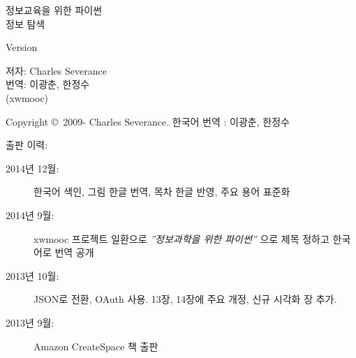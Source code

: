



\newtheorem{ex}{Exercise}[chapter]

\begin{latexonly}

\renewcommand{\blankpage}{\thispagestyle{empty} \quad \newpage}

\thispagestyle{empty}

\begin{flushright}
\vspace*{2.0in}

\begin{spacing}{3}
{\huge 정보교육을 위한 파이썬}\\
{\Large 정보 탐색}
\end{spacing}

\vspace{0.25in}

Version \theversion

\vspace{0.5in}


{\Large
저자: Charles Severance\\
번역: 이광춘, 한정수 \\
(xwmooc)
}

\vfill

\end{flushright}

\pagebreak
\thispagestyle{empty}

{\small
Copyright \copyright ~2009- Charles Severance.
한국어 번역 : 이광춘, 한정수

출판 이력:

\begin{description}

\item[2014년 12월:] 한국어 색인, 그림 한글 번역, 목차 한글 반영, 주요 용어 표준화

\item[2014년 9월:] xwmooc 프로젝트 일환으로 \emph{''정보과학을 위한 파이썬''} 으로 제목 정하고 한국어로 번역 공개

\item[2013년 10월:] JSON로 전환, OAuth 사용. 13장, 14장에 주요 개정, 신규 시각화 장 추가.

\item[2013년 9월:] Amazon CreateSpace 책 출판


\end{description}}
\end{latexonly}
